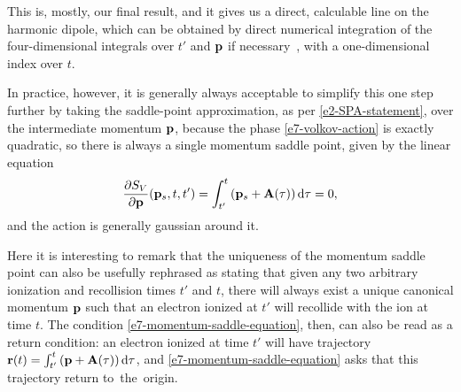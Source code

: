 This is, mostly, our final result, and it gives us a direct, calculable line on the harmonic dipole, which can be obtained by direct numerical integration of the four-dimensional integrals over $t'$ and $\vb{p}$ if necessary~\cite{LewensteinHHG}, with a one-dimensional index over $t$. 

In practice, however, it is generally always acceptable to simplify this one step further by taking the saddle-point approximation, as per \eqref{e2-SPA-statement}, over the intermediate momentum $\vb{p}$, because the phase \eqref{e7-volkov-action} is exactly quadratic, so there is always a single momentum saddle point, given by the linear equation
\begin{equation}
\frac{\partial S_V}{\partial \vb{p}}(\vb{p}_s,t,t')
=
\int_{t'}^{t} \left(\vb{p}_s+\vb{A}(\tau)\right)\mathrm{d}\tau
=0
,
\label{e7-momentum-saddle-equation}
\end{equation}
and the action is generally gaussian around it. 

Here it is interesting to remark that the uniqueness of the momentum saddle point can also be usefully rephrased as stating that given any two arbitrary ionization and recollision times $t'$ and $t$, there will always exist a unique canonical momentum $\vb{p}$ such that an electron ionized at $t'$ will recollide with the ion at time $t$. The condition \eqref{e7-momentum-saddle-equation}, then, can also be read as a return condition: an electron ionized at time $t'$ will have trajectory $\vb{r}(t)=\int_{t'}^{t} \left(\vb{p}+\vb{A}(\tau)\right)\mathrm{d}\tau$, and \eqref{e7-momentum-saddle-equation} asks that this trajectory return to~the~origin.

